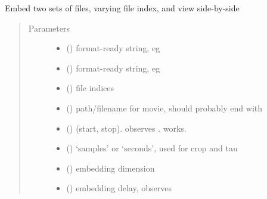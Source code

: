 \documentclass[letterpaper,10pt,openany,oneside,english]{sphinxmanual}
\begin{document}
\label{\detokenize{embed:module-embed.movies}}

\begin{fulllineitems}
\label{\detokenize{embed:embed.movies.compare_multi}}
Embed two sets of files, varying  file index, and view side-by-side
\begin{quote}\begin{description}
\item[{Parameters}] \leavevmode\begin{itemize}
\item {} 
 () \textendash{} format-ready string, eg

\item {} 
 () \textendash{} format-ready string, eg

\item {} 
 () \textendash{} file indices

\item {} 
 () \textendash{} path/filename for movie, should probably end with 

\item {} 
 () \textendash{} (start, stop). observes .  works.

\item {} 
 () \textendash{} ‘samples’ or ‘seconds’, used for crop and tau

\item {} 
 () \textendash{} embedding dimension

\item {} 
 () \textendash{} embedding delay, observes 


\end{itemize}
\end{description}
\end{quote}
\end{fulllineitems}
\end{document}
